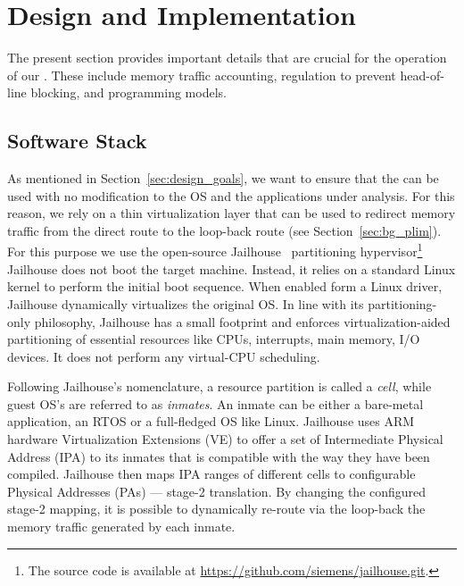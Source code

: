 \section{\schim Design and Implementation}
\label{sec:schim_implmentation}

The present section provides important details that are crucial for
the operation of our \schim. These include memory traffic accounting,
regulation to prevent head-of-line blocking, and programming models.


\subsection{Software Stack}
As mentioned in Section~\ref{sec:design_goals}, we want to ensure that
the \schim can be used with no modification to the OS and the
applications under analysis. For this reason, we rely on a thin
virtualization layer that can be used to redirect memory traffic from
the direct route to the loop-back route (see
Section~\ref{sec:bg_plim}). For this purpose we use the open-source
Jailhouse~\cite{jailhouse} partitioning hypervisor\footnote{The source
  code is available at
  \url{https://github.com/siemens/jailhouse.git}.}  Jailhouse does not
boot the target machine. Instead, it relies on a standard Linux kernel
to perform the initial boot sequence. When enabled form a Linux
driver, Jailhouse dynamically virtualizes the original OS. In line
with its partitioning-only philosophy, Jailhouse has a small footprint
and enforces virtualization-aided partitioning of essential resources
like CPUs, interrupts, main memory, I/O devices. It does not perform
any virtual-CPU scheduling.

Following Jailhouse's nomenclature, a resource partition is called a
\emph{cell}, while guest OS's are referred to as \emph{inmates}. An
inmate can be either a bare-metal application, an RTOS or a
full-fledged OS like Linux. Jailhouse uses ARM hardware Virtualization
Extensions (VE) to offer a set of Intermediate Physical Address (IPA)
to its inmates that is compatible with the way they have been
compiled. Jailhouse then maps IPA ranges of different cells to
configurable Physical Addresses (PAs) --- stage-2 translation. By
changing the configured stage-2 mapping, it is possible to dynamically
re-route via the loop-back the memory traffic generated by each
inmate. 

